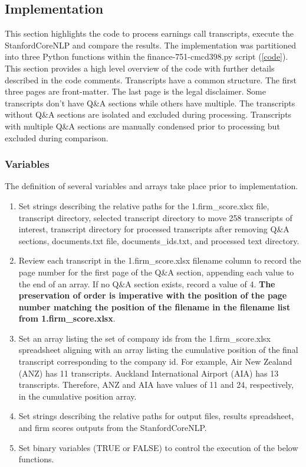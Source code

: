 \documentclass[11pt]{article}
\begin{document}
\subsection{Implementation}
This section highlights the code to process earnings call transcripts, execute the StanfordCoreNLP and compare the results.
The implementation was partitioned into three Python functions within the finance-751-cmcd398.py script (\ref{code}).
This section provides a high level overview of the code with further details described in the code comments.
Transcripts have a common structure. The first three pages are front-matter. The last page is the legal disclaimer.
Some transcripts don't have Q\&A sections while others have multiple. 
The transcripts without Q\&A sections are isolated and excluded during processing.
Transcripts with multiple Q\&A sections are manually condensed prior to processing but excluded during comparison.
\subsubsection{Variables}
The definition of several variables and arrays take place prior to implementation.
\begin{enumerate}
    \item Set strings describing the relative paths for the 1.firm\_score.xlsx file, transcript directory, selected transcript directory to move 258 transcripts of interest, transcript directory for processed transcripts after removing Q\&A sections,
    documents.txt file, documents\_ids.txt, and processed text directory.
    \item Review each transcript in the 1.firm\_score.xlsx filename column to record the page number for the first page of the Q\&A section, appending each value to the end of an array.
    If no Q\&A section exists, record a value of 4. \textbf{The preservation of order is imperative with the position of the page number matching the position of the filename in the filename list from 1.firm\_score.xlsx}.
    \item Set an array listing the set of company ids from the 1.firm\_score.xlsx spreadsheet aligning with an array listing the cumulative position of the final transcript corresponding to the company id.
    For example, Air New Zealand (ANZ) has 11 transcripts. Auckland International Airport (AIA) has 13 transcripts. Therefore, ANZ and AIA have values of 11 and 24, respectively, in the cumulative position array. 
    \item Set strings describing the relative paths for output files, results spreadsheet, and firm scores outputs from the StanfordCoreNLP.
    \item Set binary variables (TRUE or FALSE) to control the execution of the below functions.
\end{enumerate}
\end{document}
